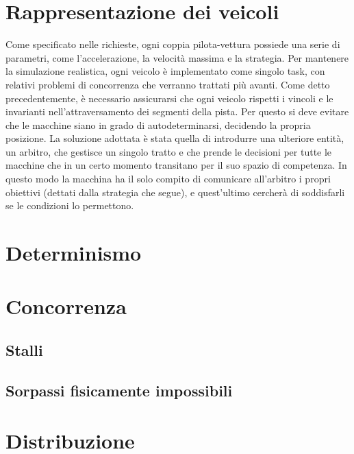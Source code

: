 
\section{Rappresentazione dei veicoli}

Come specificato nelle richieste, ogni coppia pilota-vettura possiede una serie di parametri, come l’accelerazione, la velocità massima e la strategia. Per mantenere la simulazione realistica, ogni veicolo è implementato come singolo task, con relativi problemi di concorrenza che verranno trattati più avanti. Come detto precedentemente, è necessario assicurarsi che ogni veicolo rispetti i vincoli e le invarianti nell’attraversamento dei segmenti della pista. Per questo si deve evitare che le macchine siano in grado di autodeterminarsi, decidendo la propria posizione. La soluzione adottata è stata quella di introdurre una ulteriore entità, un arbitro, che gestisce un singolo tratto e che prende le decisioni per tutte le macchine che in un certo momento transitano per il suo spazio di competenza. 
In questo modo la macchina ha il solo compito di comunicare all’arbitro i propri obiettivi (dettati dalla strategia che segue), e quest’ultimo cercherà di soddisfarli se le condizioni lo permettono.

\section{Determinismo}

\section{Concorrenza}
 \subsection{Stalli}
 \subsection{Sorpassi fisicamente impossibili}

\section{Distribuzione}